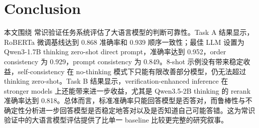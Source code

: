 \section{Conclusion}

本文围绕 \comve 常识验证任务系统评估了大语言模型的判断可靠性。Task A 结果显示，RoBERTa 微调基线达到 0.868 准确率和 0.939 顺序一致性；最佳 LLM 设置为 Qwen3-1.7B thinking zero-shot direct prompt，准确率达到 0.952，order consistency 为 0.929，prompt consistency 为 0.849。8-shot 示例没有带来稳定收益，self-consistency 在 no-thinking 模式下只能有限改善部分模型，仍无法超过 thinking zero-shot。Task B 结果显示，verification-enhanced inference 在 stronger models 上还能带来进一步收益，尤其是 Qwen3.5-2B thinking 的 rerank 准确率达到 0.818。总体而言，标准准确率只能回答模型是否答对，而鲁棒性与不确定性分析进一步回答模型是否稳定地答对以及是否知道自己可能答错。这为常识验证中的大语言模型评估提供了比单一 baseline 比较更完整的研究叙事。
